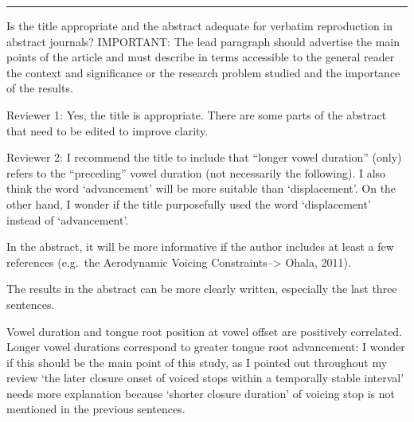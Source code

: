 \documentclass[]{article}
\begin{document}
\rule{\textwidth}{0.4pt}

Is the title appropriate and the abstract adequate for verbatim
reproduction in abstract journals? IMPORTANT: The lead paragraph should
advertise the main points of the article and must describe in terms
accessible to the general reader the context and significance or the
research problem studied and the importance of the results.

Reviewer 1: Yes, the title is appropriate. There are some parts of the
abstract that need to be edited to improve clarity.

Reviewer 2: I recommend the title to include that ``longer vowel
duration'' (only) refers to the ``preceding'' vowel duration (not
necessarily the following). I also think the word `advancement' will be
more suitable than `displacement'. On the other hand, I wonder if the
title purposefully used the word `displacement' instead of
`advancement'.

In the abstract, it will be more informative if the author includes at
least a few references (e.g.~the Aerodynamic Voicing
Constraints--\textgreater{} Ohala, 2011).

The results in the abstract can be more clearly written, especially the
last three sentences.

Vowel duration and tongue root position at vowel offset are positively
correlated. Longer vowel durations correspond to greater tongue root
advancement: I wonder if this should be the main point of this study, as
I pointed out throughout my review `the later closure onset of voiced
stops within a temporally stable interval' needs more explanation
because `shorter closure duration' of voicing stop is not mentioned in
the previous sentences.
\end{document}
